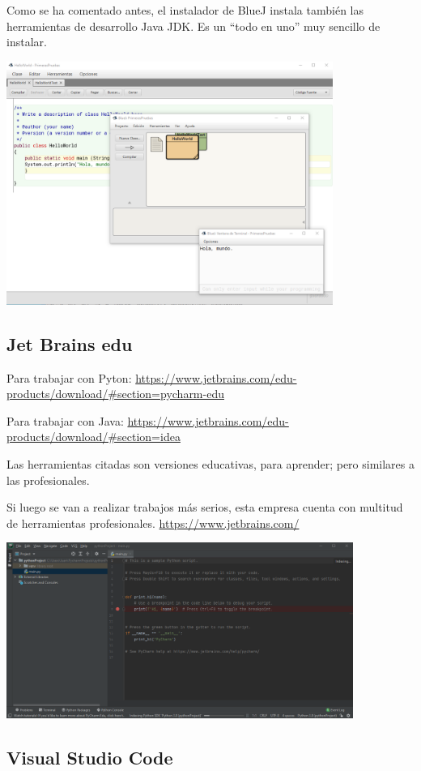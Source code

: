 \documentclass[spanish,12pt,a4paper,final,oneside]{book}
\begin{document}
Como se ha comentado antes, el instalador de BlueJ instala también las herramientas de desarrollo Java JDK. Es un ``todo en uno'' muy sencillo de instalar.

\includegraphics[width=0.8\textwidth]{pantallazo de BlueJ.png}


\subsection{Jet Brains edu}

Para trabajar con Pyton: \url{https://www.jetbrains.com/edu-products/download/#section=pycharm-edu}

Para trabajar con Java: \url{https://www.jetbrains.com/edu-products/download/#section=idea}

Las herramientas citadas son versiones educativas, para aprender; pero similares a las profesionales.

Si luego se van a realizar trabajos más serios, esta empresa cuenta con multitud de herramientas profesionales. \url{https://www.jetbrains.com/}

\includegraphics[width=0.85\textwidth]{pantallazo de PyCharm.png}


\subsection{Visual Studio Code}
\end{document}

